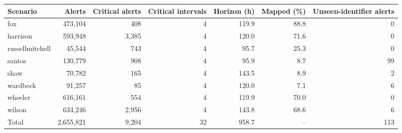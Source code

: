 \begin{tabular}{lrrrrrr}
\toprule
Scenario & Alerts & Critical alerts & Critical intervals & Horizon (h) & Mapped (\%) & Unseen-identifier alerts \\
\midrule
fox & 473,104 & 408 & 4 & 119.9 & 88.8 & 0 \\
harrison & 593,948 & 3,385 & 4 & 120.0 & 71.6 & 0 \\
russellmitchell & 45,544 & 743 & 4 & 95.7 & 25.3 & 0 \\
santos & 130,779 & 908 & 4 & 95.9 & 8.7 & 99 \\
shaw & 70,782 & 165 & 4 & 143.5 & 8.9 & 2 \\
wardbeck & 91,257 & 85 & 4 & 120.0 & 7.1 & 6 \\
wheeler & 616,161 & 554 & 4 & 119.9 & 70.0 & 0 \\
wilson & 634,246 & 2,956 & 4 & 143.8 & 68.6 & 6 \\
\midrule
Total & 2,655,821 & 9,204 & 32 & 958.7 & -- & 113 \\
\bottomrule
\end{tabular}
